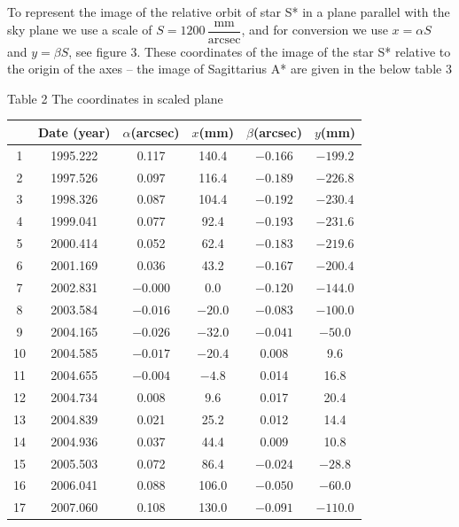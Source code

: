 To represent the image of the relative orbit of star S* in a plane parallel
with the sky plane we use a scale of
$S = 1200\,\dfrac{\mathrm{mm}}{\mathrm{arcsec}}$, and for conversion we use
$x = \alpha S$ and $y = \beta S$, see figure 3. These coordinates of the image
of the star S* relative to the origin of the axes -- the image of Sagittarius
A* are given in the below table 3

\begin{center}
Table 2 The coordinates in scaled plane

\begin{tabular}{|c|c|c|c|c|c|}
\hline
 & Date (year) & $\alpha$(arcsec) & $x$(mm) & $\beta$(arcsec) & $y$(mm)\\
\hline
1  & 1995.222 & 0.117  & 140.4  & $-0.166$ & $-199.2$\\
2  & 1997.526 & 0.097  & 116.4  & $-0.189$ & $-226.8$\\
3  & 1998.326 & 0.087  & 104.4  & $-0.192$ & $-230.4$\\
4  & 1999.041 & 0.077  & 92.4   & $-0.193$ & $-231.6$\\
5  & 2000.414 & 0.052  & 62.4   & $-0.183$ & $-219.6$\\
6  & 2001.169 & 0.036  & 43.2   & $-0.167$ & $-200.4$\\
7  & 2002.831 & $-0.000$ & 0.0    & $-0.120$ & $-144.0$\\
8  & 2003.584 & $-0.016$ & $-20.0$  & $-0.083$ & $-100.0$\\
9  & 2004.165 & $-0.026$ & $-32.0$  & $-0.041$ & $-50.0$\\
10 & 2004.585 & $-0.017$ & $-20.4$  & 0.008  & 9.6\\
11 & 2004.655 & $-0.004$ & $-4.8$   & 0.014  & 16.8\\
12 & 2004.734 & 0.008  & 9.6    & 0.017  & 20.4\\
13 & 2004.839 & 0.021  & 25.2   & 0.012  & 14.4\\
14 & 2004.936 & 0.037  & 44.4   & 0.009  & 10.8\\
15 & 2005.503 & 0.072  & 86.4   & $-0.024$ & $-28.8$\\
16 & 2006.041 & 0.088  & 106.0  & $-0.050$ & $-60.0$\\
17 & 2007.060 & 0.108  & 130.0  & $-0.091$ & $-110.0$\\
\hline
\end{tabular}
\end{center}

